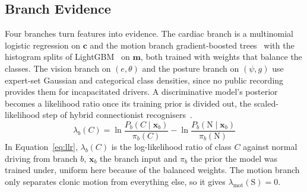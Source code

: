 \documentclass[conference]{IEEEtran}
\begin{document}
\subsection{Branch Evidence}
Four branches turn features into evidence. The cardiac branch is a multinomial logistic regression on $\mathbf{c}$ and the motion branch gradient-boosted trees~\cite{friedman2001} with the histogram splits of LightGBM~\cite{ke2017} on $\mathbf{m}$, both trained with weights that balance the classes. The vision branch on $(e,\theta)$ and the posture branch on $(\psi,g)$ use expert-set Gaussian and categorical class densities, since no public recording provides them for incapacitated drivers. A discriminative model's posterior becomes a likelihood ratio once its training prior is divided out, the scaled-likelihood step of hybrid connectionist recognisers~\cite{bourlard1994}.
\begin{equation}
\lambda_b(C)=\ln\frac{P_b(C\mid\mathbf{x}_b)}{\pi_b(C)}-\ln\frac{P_b(\mathrm{N}\mid\mathbf{x}_b)}{\pi_b(\mathrm{N})}
\label{eq:llr}
\end{equation}
In Equation~\eqref{eq:llr}, $\lambda_b(C)$ is the log-likelihood ratio of class $C$ against normal driving from branch $b$, $\mathbf{x}_b$ the branch input and $\pi_b$ the prior the model was trained under, uniform here because of the balanced weights. The motion branch only separates clonic motion from everything else, so it gives $\lambda_{\mathrm{mot}}(\mathrm{S})=0$.
\end{document}
